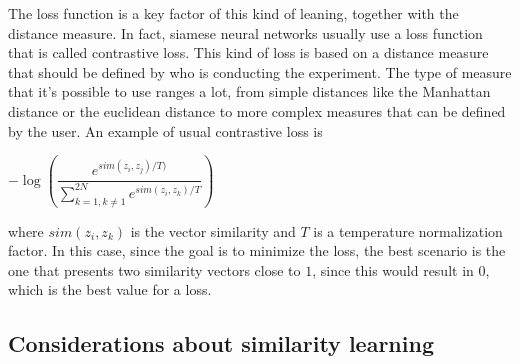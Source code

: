 \documentclass[conference]{IEEEtran}
\begin{document}
			\noindent The loss function is a key factor of this kind of leaning, together with the distance measure. In fact, siamese neural networks usually use a loss function that is called contrastive loss. This kind 
			of loss is based on a distance measure that should be defined by who is conducting the experiment. The type of measure that it's possible to use ranges a lot, from simple distances like the Manhattan distance 
			or the euclidean distance to more complex measures that can be defined by the user. An example of usual contrastive loss is 
			\begin{center}
				$-\log(\dfrac{e^{sim(z_i, z_j) / T)}}{\sum_{k=1, k\neq 1}^{2N} e^{sim(z_i, z_k) / T}})$
			\end{center}
			where $sim(z_i, z_k)$ is the vector similarity and $T$ is a temperature normalization factor. In this case, since the goal is to minimize the loss, the best scenario is the one that presents two similarity 
			vectors close to $1$, since this would result in $0$, which is the best value for a loss. 
			
		
		\subsection{Considerations about similarity learning\label{sec:csl}}
		
\end{document}
